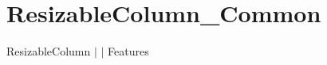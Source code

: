 \chapter{Resizable\+Column\+\_\+\+Common }
\hypertarget{md__docs_2_common_2_features_2_resizable_column___common}{}\label{md__docs_2_common_2_features_2_resizable_column___common}
Resizable\+Column \texorpdfstring{$\vert$}{|}  \texorpdfstring{$\vert$}{|} Features



 